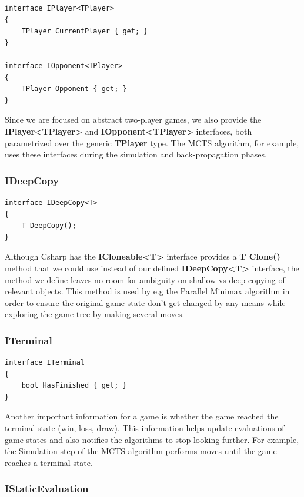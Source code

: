 \begin{lstlisting}
interface IPlayer<TPlayer>
{
    TPlayer CurrentPlayer { get; }
}

interface IOpponent<TPlayer>
{
    TPlayer Opponent { get; }
}
\end{lstlisting}

Since we are focused on abstract two-player games, we also provide the \textbf{IPlayer\textless{}TPlayer\textgreater{}} and \textbf{IOpponent\textless{}TPlayer\textgreater{}} interfaces, both parametrized over the generic \textbf{TPlayer} type.
The \gls{MCTS} algorithm, for example, uses these interfaces during the simulation and back-propagation phases.

\subsubsection{IDeepCopy}

\begin{lstlisting}
interface IDeepCopy<T>
{
    T DeepCopy();
}
\end{lstlisting}
Although \gls{Csharp} has the \textbf{ICloneable\textless{}T\textgreater{}} interface provides a \textbf{T Clone()} method that we could use instead of our defined \textbf{IDeepCopy\textless{}T\textgreater{}} interface, the method we define leaves no room for ambiguity on shallow vs deep copying of relevant objects.
This method is used by e.g the Parallel Minimax algorithm in order to ensure the original game state don't get changed by any means while exploring the game tree by making several moves.

\subsubsection{ITerminal}

\begin{lstlisting}
interface ITerminal
{
    bool HasFinished { get; }
}
\end{lstlisting}
Another important information for a game is whether the game reached the terminal state (win, loss, draw). This information helps update evaluations of game states and also notifies the algorithms to stop looking further. For example, the Simulation step of the \gls{MCTS} algorithm performs moves until the game reaches a terminal state.

\subsubsection{IStaticEvaluation}

